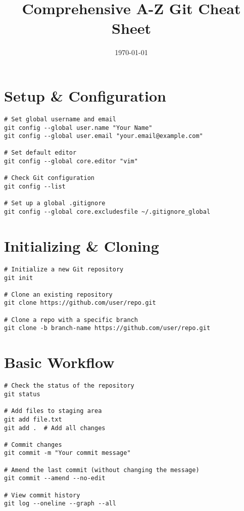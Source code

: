 \documentclass[11pt]{article}
\title{\textbf{Comprehensive A-Z Git Cheat Sheet}}
\author{}
\date{\today}
\begin{document}
    \maketitle

    \section*{Setup & Configuration}
    \begin{lstlisting}[style=gitStyle]
# Set global username and email
git config --global user.name "Your Name"
git config --global user.email "your.email@example.com"

# Set default editor
git config --global core.editor "vim"

# Check Git configuration
git config --list

# Set up a global .gitignore
git config --global core.excludesfile ~/.gitignore_global
    \end{lstlisting}

    \section*{Initializing & Cloning}
    \begin{lstlisting}[style=gitStyle]
# Initialize a new Git repository
git init

# Clone an existing repository
git clone https://github.com/user/repo.git

# Clone a repo with a specific branch
git clone -b branch-name https://github.com/user/repo.git
    \end{lstlisting}

    \section*{Basic Workflow}
    \begin{lstlisting}[style=gitStyle]
# Check the status of the repository
git status

# Add files to staging area
git add file.txt
git add .  # Add all changes

# Commit changes
git commit -m "Your commit message"

# Amend the last commit (without changing the message)
git commit --amend --no-edit

# View commit history
git log --oneline --graph --all
    \end{lstlisting}
\end{document}
